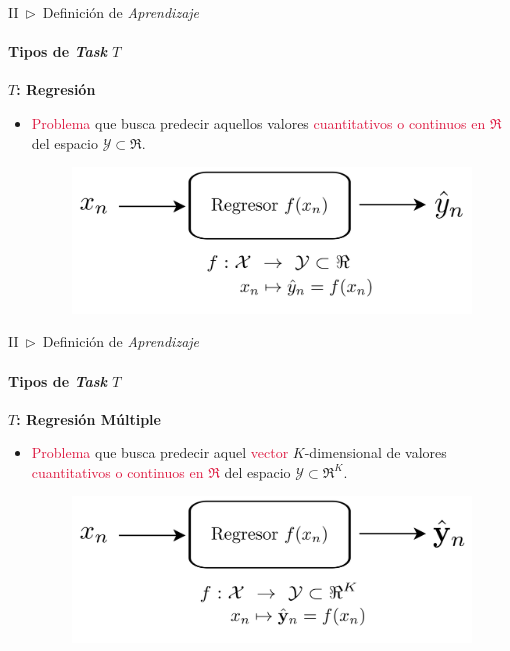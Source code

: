 \documentclass[xcolor=dvipsnames]{beamer}
\begin{document}
    \begin{frame}{II~$\rhd$~Definición de \textit{Aprendizaje}}
    \framesubtitle{Tipos de \textit{Task} \( T \)}
        \textbf{\Large{\( T \): Regresión}}
        \vspace{2mm}
        \begin{itemize}
            \item \textcolor{crimson}{Problema} que busca predecir aquellos valores \textcolor{crimson}{cuantitativos o continuos en $\Re$} del espacio $\mathcal{Y}\subset\Re$.
            \vspace{1mm}
            \begin{figure}
                \centering
                \includegraphics[width=0.9\linewidth]{imgs/def01/task05.png}
            \end{figure}
        \end{itemize}
    \end{frame}

    \begin{frame}{II~$\rhd$~Definición de \textit{Aprendizaje}}
    \framesubtitle{Tipos de \textit{Task} \( T \)}
        \textbf{\Large{\( T \): Regresión Múltiple}}
        \vspace{2mm}
        \begin{itemize}
            \item \textcolor{crimson}{Problema} que busca predecir aquel \textcolor{crimson}{vector} $K$-dimensional de valores \textcolor{crimson}{cuantitativos o continuos en $\Re$} del espacio $\mathcal{Y}\subset\Re^{K}$.
            \vspace{1mm}
            \begin{figure}
                \centering
                \includegraphics[width=0.9\linewidth]{imgs/def01/task06.png}
            \end{figure}
        \end{itemize}
    \end{frame}
\end{document}
